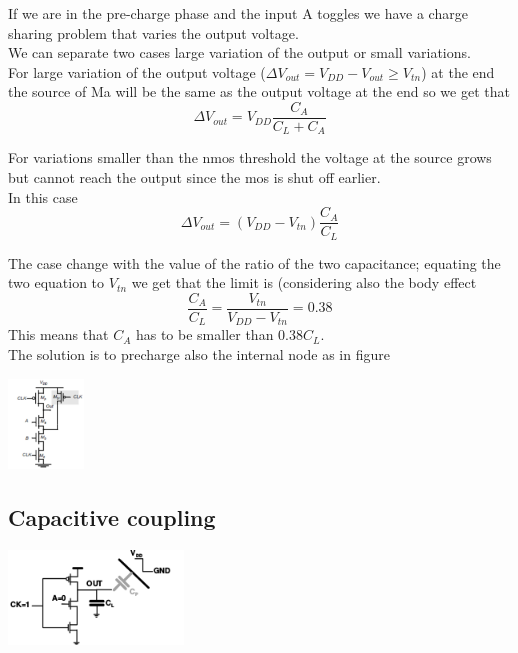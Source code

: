 If we are in the pre-charge phase and the input A toggles we have a charge sharing problem that varies the output voltage.\\
We can separate two cases large variation of the output or small variations.\\
\vspace{3mm}
For large variation of the output voltage ($\Delta V_{out}=V_{DD}-V_{out}\ge V_{tn} $) at the end the source of Ma will be the same as the output voltage at the end so we get that 
\begin{equation}
\Delta V_{out}=V_{DD}\frac{C_A}{C_L+C_A}
\end{equation}

\vspace{3mm}
For variations smaller than the nmos threshold the voltage at the source grows but cannot reach the output since the mos is shut off earlier.\\
In this case 
\begin{equation}
\Delta V_{out}=(V_{DD}-V_{tn})\frac{C_A}{C_L}
\end{equation}

\vspace{3mm}
The case change with the value of the ratio of the two capacitance; equating  the two equation to $V_{tn}$ we get that the limit is (considering also the body effect
\begin{equation}
\frac{C_A}{C_L}=\frac{V_{tn}}{V_{DD}-V_{tn}} = 0.38
\end{equation}
This means that $C_A$ has to be smaller than 0.38$C_L$.\\


\vspace{5mm}
The solution is to precharge also the internal node as in figure

\centering
\includegraphics[width=0.15\textwidth]{C9_5.png}\\
\raggedright

\subsection{Capacitive coupling}

\centering
\includegraphics[width=0.35\textwidth]{C9_6.png}\\
\raggedright

